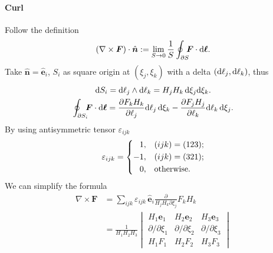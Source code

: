 \documentclass{article}
\def\d{{\rm d}}
\def\id{\,\d}%
\newcommand{\ko}[1]{\hspace{-#1 pt}}%
\newcommand{\pd}[2]{\frac{\partial #1}{\partial #2}}%
\newcommand{\ubm}[1]{\hat{\bm #1}}%
\newcommand{\ibm}[1]{\,\hat{\bm #1}}%
\begin{document}
\paragraph{Curl} Follow the definition
$$(\nabla\times\bm F)\cdot\ubm n:=\lim_{S\to0}\frac1S\oint_{\partial S}\ko5\bm F\cdot\d\bm\ell.$$
Take $\ubm n=\ubm e_i$, $S_i$ as square origin at $(\xi_j,\xi_k)$ with a delta $(\d\ell_j,\d\ell_k)$, thus
\begin{gather*}
	\d S_i=\d\ell_j\wedge\d\ell_k=H_jH_k\id\xi_j\d\xi_k.\\
	\oint_{\partial S_i}\ko5\bm F\cdot\d\bm\ell=\pd{F_kH_k}{\ell_j}\d\ell_j\id\xi_k-\pd{F_jH_j}{\ell_k}\d\ell_k\id\xi_j.
\end{gather*}
By using antisymmetric tensor $\varepsilon_{ijk}$
\begin{align*}
	\varepsilon_{ijk}=\left\{
	\begin{aligned}
		1,  & \quad(ijk)=(123);     \\
		-1, & \quad(ijk)=(321);     \\
		0,  & \quad{\rm otherwise}.
	\end{aligned}
	\right.
\end{align*}
We can simplify the formula
\begin{align*}
	\nabla\times\bm F & =\sum_{ijk}\varepsilon_{ijk}\ibm e_i\frac{\partial}{H_jH_k\partial\xi_j}F_kH_k \\
	                  & =\frac1{H_1H_2H_3}\begin{vmatrix}
		H_1\bm e_1             & H_2\bm e_2             & H_3\bm e_3             \\
		\partial/\partial\xi_1 & \partial/\partial\xi_2 & \partial/\partial\xi_3 \\
		H_1F_1                 & H_2F_2                 & H_3F_3
	\end{vmatrix}
\end{align*}
\end{document}
